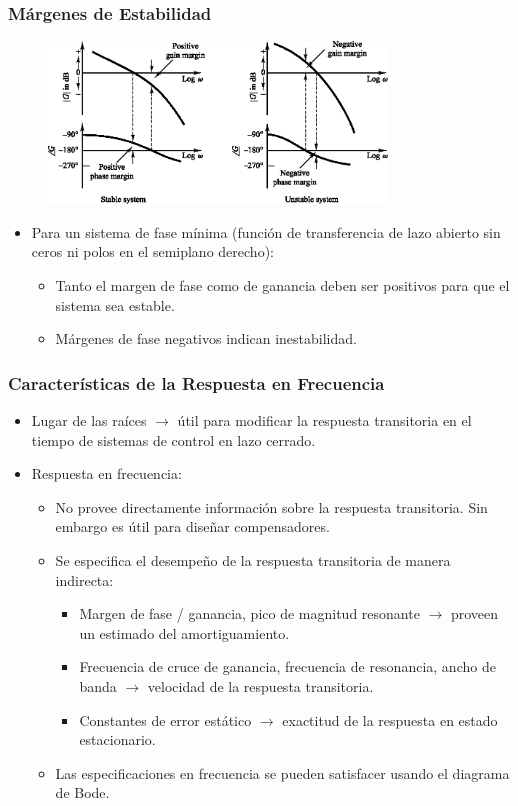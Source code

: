 \documentclass[aspectratio=169]{beamer}
\theoremstyle{definition}
\theoremstyle{plain}
\theoremstyle{remark}
\begin{document}
\begin{frame}[<+->]\frametitle{Márgenes de Estabilidad}
	\begin{figure}
		\centering
		\includegraphics[width=9cm]{images/phaseGainMarginsStability.eps}
	\end{figure}
	\vspace*{-3mm}
	\begin{itemize}
		\item Para un sistema de fase mínima (función de transferencia de lazo abierto sin ceros ni polos en el semiplano derecho):
		\begin{itemize}
			\item Tanto el margen de fase como de ganancia deben ser positivos para que el sistema sea estable.
			\item Márgenes de fase negativos indican inestabilidad.
		\end{itemize}
	\end{itemize}
\end{frame}

\begin{frame}[<+->]\frametitle{Características de la Respuesta en Frecuencia}
	\begin{itemize}
		\item Lugar de las raíces $\rightarrow$ útil para modificar la respuesta transitoria en el tiempo de sistemas de control en lazo cerrado.
		\item Respuesta en frecuencia:
		\begin{itemize}
			\item No provee directamente información sobre la respuesta transitoria. Sin embargo es útil para diseñar compensadores.
			\item Se especifica el desempeño de la respuesta transitoria de manera indirecta:
			\begin{itemize}
				\item Margen de fase / ganancia, pico de magnitud resonante $\rightarrow$ proveen un estimado del amortiguamiento.
				\item Frecuencia de cruce de ganancia, frecuencia de resonancia, ancho de banda $\rightarrow$ velocidad de la respuesta transitoria.
				\item Constantes de error estático $\rightarrow$ exactitud de la respuesta en estado estacionario.
			\end{itemize}
			\item Las especificaciones en frecuencia se pueden satisfacer usando el diagrama de Bode.
		\end{itemize}
	\end{itemize}
\end{frame}
\end{document}
